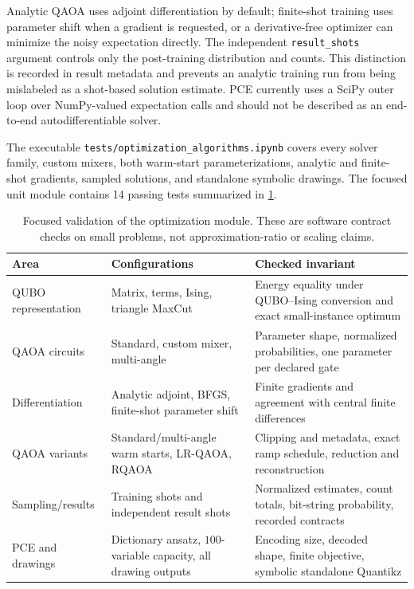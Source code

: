 \documentclass[10pt]{article}
\newcommand{\code}[1]{\texttt{#1}}
\begin{document}
Analytic QAOA uses adjoint differentiation by default; finite-shot training
uses parameter shift when a gradient is requested, or a derivative-free
optimizer can minimize the noisy expectation directly.  The independent
\code{result\_shots} argument controls only the post-training distribution and
counts.  This distinction is recorded in result metadata and prevents an
analytic training run from being mislabeled as a shot-based solution estimate.
PCE currently uses a SciPy outer loop over NumPy-valued expectation calls and
should not be described as an end-to-end autodifferentiable solver.

The executable \code{tests/optimization\_algorithms.ipynb} covers every solver
family, custom mixers, both warm-start parameterizations, analytic and
finite-shot gradients, sampled solutions, and standalone symbolic drawings.
The focused unit module contains 14 passing tests summarized in
\cref{tab:optimization-validation}.

\begin{table}[H]
\centering
\caption{Focused validation of the optimization module.  These are software
contract checks on small problems, not approximation-ratio or scaling claims.}
\label{tab:optimization-validation}
\small
\begin{tabularx}{\textwidth}{@{}p{}p{}X@{}}
\toprule
Area & Configurations & Checked invariant \\
\midrule
QUBO representation & Matrix, terms, Ising, triangle MaxCut & Energy equality under QUBO--Ising conversion and exact small-instance optimum \\
QAOA circuits & Standard, custom mixer, multi-angle & Parameter shape, normalized probabilities, one parameter per declared gate \\
Differentiation & Analytic adjoint, BFGS, finite-shot parameter shift & Finite gradients and agreement with central finite differences \\
QAOA variants & Standard/multi-angle warm starts, LR-QAOA, RQAOA & Clipping and metadata, exact ramp schedule, reduction and reconstruction \\
Sampling/results & Training shots and independent result shots & Normalized estimates, count totals, bit-string probability, recorded contracts \\
PCE and drawings & Dictionary ansatz, $100$-variable capacity, all drawing outputs & Encoding size, decoded shape, finite objective, symbolic standalone Quantikz \\
\bottomrule
\end{tabularx}
\end{table}
\end{document}
